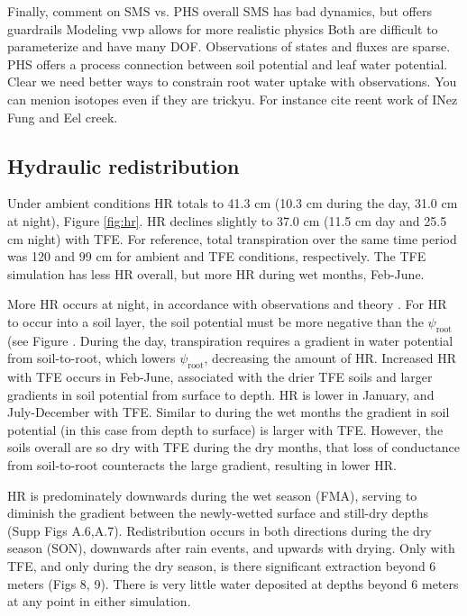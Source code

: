 \documentclass[draft,linenumbers]{agujournal}
\begin{document}
    Finally, comment on SMS vs. PHS overall
        SMS has bad dynamics, but offers guardrails
        Modeling vwp allows for more realistic physics
        Both are difficult to parameterize and have many DOF.
        Observations of states and fluxes are sparse.
        PHS offers a process connection between soil potential and leaf water potential.
        Clear we need better ways to constrain root water uptake with observations. You can menion isotopes even if they are trickyu. For instance cite reent work of INez Fung and Eel creek.

\subsection{Hydraulic redistribution}

    Under ambient conditions HR totals to 41.3 cm (10.3 cm during the day, 31.0 cm at night), Figure \ref{fig:hr}. 
    HR declines slightly to 37.0 cm (11.5 cm day and 25.5 cm night) with TFE.
    For reference, total transpiration over the same time period was 120 and 99 cm for ambient and TFE conditions, respectively.
    The TFE simulation has less HR overall, but more HR during wet months, Feb-June.
    
    More HR occurs at night, in accordance with observations and theory \citep{oliveira2005,lee2005}.
    For HR to occur into a soil layer, the soil potential must be more negative than the $\psi_{\text{root}}$ (see Figure .
    During the day, transpiration requires a gradient in water potential from soil-to-root, which lowers $\psi_{\text{root}}$, decreasing the amount of HR.
    Increased HR with TFE occurs in Feb-June, associated with the drier TFE soils and larger gradients in soil potential from surface to depth.
    HR is lower in January, and July-December with TFE.
    Similar to during the wet months the gradient in soil potential (in this case from depth to surface) is larger with TFE.
    However, the soils overall are so dry with TFE during the dry months, that loss of conductance from soil-to-root counteracts the large gradient, resulting in lower HR.
    
    HR is predominately downwards during the wet season (FMA), serving to diminish the gradient between the newly-wetted surface and still-dry depths (Supp Figs A.6,A.7).
    Redistribution occurs in both directions during the dry season (SON), downwards after rain events, and upwards with drying.
    Only with TFE, and only during the dry season, is there significant extraction beyond 6 meters (Figs 8, 9).
    There is very little water deposited at depths beyond 6 meters at any point in either simulation.
    
\end{document}
